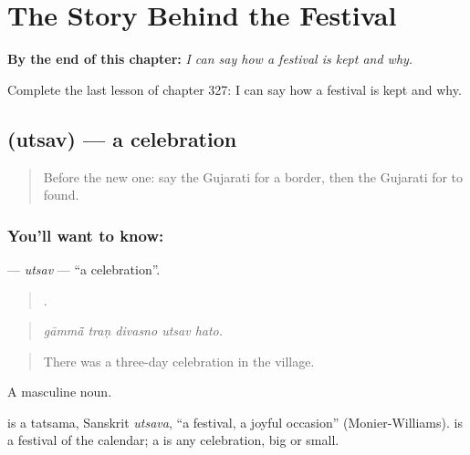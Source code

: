 
\chapter{The Story Behind the Festival}
\label{ch:gu-the-story-behind-the-festival}

\begin{chapteropening}
\textbf{By the end of this chapter:} \emph{I can say how a festival is kept and why.}

Complete the last lesson of chapter 327: I can say how a festival is kept and why.
\end{chapteropening}

\section[\texorpdfstring{\gu{ઉત્સવ} (utsav)}{ઉત્સવ (utsav)}]{ (utsav) — a celebration}

\label{lesson:GU-C327-utsav}



\begin{quote}
Before the new one: say the Gujarati for a border, then the Gujarati for to found.
\end{quote}

\subsection*{You'll want to know: }
\textbf{} — \emph{utsav} — \textquotedblleft{}a celebration\textquotedblright{}.

\begin{quote}
    .
\end{quote}

\begin{quote}
\emph{gāmmā̃ traṇ divasno utsav hato.}
\end{quote}

\begin{quote}
There was a three-day celebration in the village.
\end{quote}

A masculine noun.

\begin{cousinweb}
is a tatsama, Sanskrit \emph{utsava}, \textquotedblleft{}a festival, a joyful occasion\textquotedblright{} (Monier-Williams). \textbf{} is a festival of the calendar; a \textbf{} is any celebration, big or small.
\end{cousinweb}

